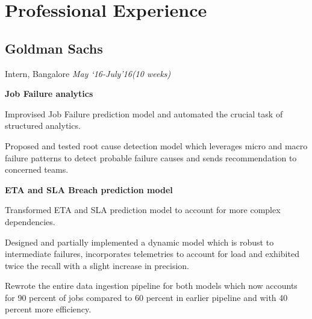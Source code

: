 \documentclass[a4paper]{twentysecondcv} %
\begin{document}




\makeprofile %

\vspace{-2mm}
\section{Professional Experience}
\vspace{-2mm}

\subsection{\textbf{Goldman Sachs}}
\vspace{-2mm}
Intern, Bangalore \hfill \emph{May `16-July'16(10 weeks)}\\
\vspace{-4mm}\begin{list3} %
\item \textbf{Job Failure analytics}
  \begin{list3} \itemsep -1pt
  \item Improvised Job Failure prediction model and automated the
    crucial task of structured analytics.
  \item Proposed and tested root cause detection model which leverages
    micro and macro failure patterns to detect probable failure causes
    and sends recommendation to concerned teams.
  \end{list3}
  \item \textbf{ETA and SLA Breach prediction model}
  \begin{list3}  \itemsep -1pt
  \item Transformed ETA and SLA prediction model to account for more
    complex dependencies.
  \item Designed and partially implemented a dynamic model which is robust to
    intermediate failures, incorporates telemetries to account for load and
    exhibited twice the recall with a slight increase in precision.
  \end{list3}
\item Rewrote the entire data ingestion pipeline for both models which now
  accounts for 90 percent of jobs compared to 60 percent in earlier
  pipeline and with 40 percent more efficiency.
  \newline
  \newline
\end{list3}
\vspace{1mm}
\end{document}
